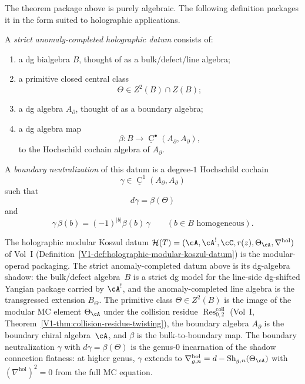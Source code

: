 The theorem package above is purely algebraic.
The following definition packages it in the form suited to holographic applications.

\begin{definition}
A \emph{strict anomaly-completed holographic datum} consists of:
\begin{enumerate}
\item a dg bialgebra \(B\), thought of as a bulk/defect/line algebra;
\item a primitive closed central class
\[
\Theta\in Z^{2}(B)\cap Z(B);
\]
\item a dg algebra \(A_{\partial}\), thought of as a boundary algebra;
\item a dg algebra map
\[
\beta:B\longrightarrow \underline{\operatorname{C}}^{\bullet}(A_{\partial},A_{\partial}),
\]
to the Hochschild cochain algebra of \(A_{\partial}\).
\end{enumerate}
A \emph{boundary neutralization} of this datum is a degree-\(1\) Hochschild cochain
\[
\gamma\in \underline{\operatorname{C}}^{1}(A_{\partial},A_{\partial})
\]
such that
\[
d\gamma=\beta(\Theta)
\]
and
\[
\gamma\,\beta(b)=(-1)^{|b|}\beta(b)\,\gamma
\qquad (b\in B \text{ homogeneous}).
\]
\end{definition}

\begin{remark}
The holographic modular Koszul datum
$\mathcal H(T) = (\cA,\cA^!,\cC,r(z),\Theta_\cA,
\nabla^{\mathrm{hol}})$
of Vol~I (Definition~\ref*{V1-def:holographic-modular-koszul-datum})
is the modular-operad packaging. The strict anomaly-completed
datum above is its dg-algebra shadow: the bulk/defect algebra~$B$
is a strict dg model for the line-side dg-shifted Yangian package
carried by $\cA^!$, and the anomaly-completed line algebra is the
transgressed extension $B_{\Theta}$. The primitive class
$\Theta\in Z^2(B)$ is the image of the modular MC element
$\Theta_\cA$ under the collision residue
$\operatorname{Res}^{\mathrm{coll}}_{0,2}$
(Vol~I, Theorem~\ref*{V1-thm:collision-residue-twisting}),
the boundary algebra $A_\partial$ is the boundary chiral
algebra~$\cA$, and $\beta$ is the bulk-to-boundary map. The
boundary neutralization $\gamma$ with $d\gamma=\beta(\Theta)$
is the genus-$0$ incarnation of the shadow connection flatness:
at higher genus, $\gamma$ extends to
$\nabla^{\mathrm{hol}}_{g,n}=d-\operatorname{Sh}_{g,n}(\Theta_\cA)$
with $(\nabla^{\mathrm{hol}})^2=0$ from the full MC equation.
\end{remark}

